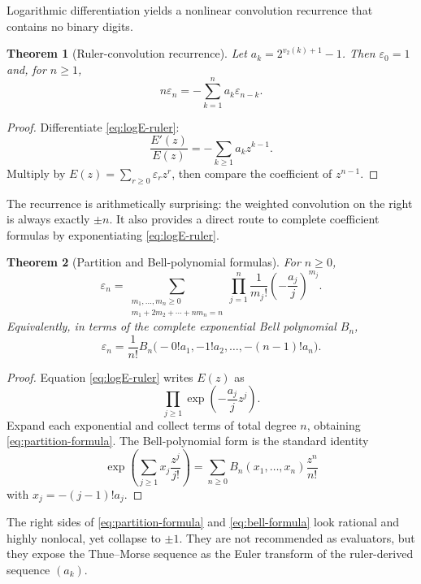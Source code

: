 \documentclass[11pt,oneside]{article}
\newtheorem{theorem}{Theorem}[section]
\theoremstyle{definition}
\theoremstyle{remark}
\newcommand{\vtwo}{v_2}
\newcommand{\eps}{\varepsilon}
\begin{document}
Logarithmic differentiation yields a nonlinear convolution recurrence that
contains no binary digits.

\begin{theorem}[Ruler-convolution recurrence]
Let \(a_k=2^{\vtwo(k)+1}-1\).  Then \(\eps_0=1\) and, for \(n\ge1\),
\begin{equation}
  \boxed{
  n\eps_n=-\sum_{k=1}^{n}a_k\eps_{n-k}.}
  \label{eq:ruler-convolution}
\end{equation}
\end{theorem}

\begin{proof}
Differentiate \eqref{eq:logE-ruler}:
\[
  \frac{E'(z)}{E(z)}=-\sum_{k\ge1}a_kz^{k-1}.
\]
Multiply by \(E(z)=\sum_{r\ge0}\eps_rz^r\), then compare the coefficient of
\(z^{n-1}\).
\end{proof}

The recurrence is arithmetically surprising: the weighted convolution on the
right is always exactly \(\pm n\).  It also provides a direct route to
complete coefficient formulas by exponentiating \eqref{eq:logE-ruler}.

\begin{theorem}[Partition and Bell-polynomial formulas]
For \(n\ge0\),
\begin{equation}
  \boxed{
  \eps_n=
  \sum_{\substack{m_1,\ldots,m_n\ge0\\
                  m_1+2m_2+\cdots+nm_n=n}}
  \prod_{j=1}^{n}
    \frac{1}{m_j!}
    \left(-\frac{a_j}{j}\right)^{m_j}.}
  \label{eq:partition-formula}
\end{equation}
Equivalently, in terms of the complete exponential Bell polynomial \(B_n\),
\begin{equation}
  \boxed{
  \eps_n=\frac1{n!}
  B_n\bigl(-0!a_1,-1!a_2,\ldots,-(n-1)!a_n\bigr).}
  \label{eq:bell-formula}
\end{equation}
\end{theorem}

\begin{proof}
Equation \eqref{eq:logE-ruler} writes \(E(z)\) as
\[
  \prod_{j\ge1}\exp\!\left(-\frac{a_j}{j}z^j\right).
\]
Expand each exponential and collect terms of total degree \(n\), obtaining
\eqref{eq:partition-formula}.  The Bell-polynomial form is the standard
identity
\[
  \exp\!\left(\sum_{j\ge1}x_j\frac{z^j}{j!}\right)
   =\sum_{n\ge0}B_n(x_1,\ldots,x_n)\frac{z^n}{n!}
\]
with \(x_j=-(j-1)!a_j\).
\end{proof}

The right sides of \eqref{eq:partition-formula} and \eqref{eq:bell-formula}
look rational and highly nonlocal, yet collapse to \(\pm1\).  They are not
recommended as evaluators, but they expose the Thue--Morse sequence as the
Euler transform of the ruler-derived sequence \((a_k)\).
\end{document}
